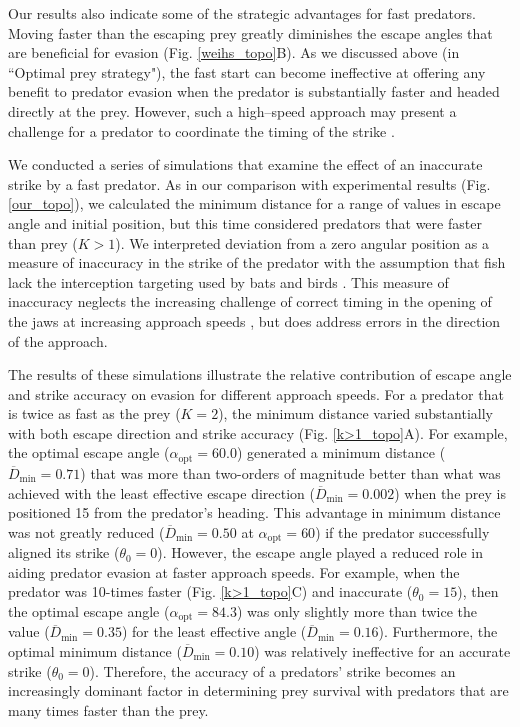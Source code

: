 \documentclass[12pt]{article}
\newcommand{\ol}{\overline}
\begin{document}
Our results also indicate some of the strategic advantages for fast predators. Moving faster than the escaping prey greatly diminishes the escape angles that are beneficial for evasion (Fig. \ref{weihs_topo}B). 
As we discussed above (in ``Optimal prey strategy"), the fast start can become ineffective at offering any benefit to predator evasion when the predator is substantially faster and headed directly at the prey. However, such a high--speed approach may present a challenge for a predator to coordinate the timing of the strike \citep{Higham:2007go, Higham:2005iu}. 

We conducted a series of simulations that examine the effect of an inaccurate strike by a fast predator. As in our comparison with experimental results (Fig. \ref{our_topo}), we calculated the minimum distance for a range of values in escape angle and initial position, but this time considered predators that were faster than prey ($K>1$). 
We interpreted deviation from a zero angular position as a measure of inaccuracy in the strike of the predator with the assumption that fish lack the interception targeting used by bats \citep{Ghose:2006dk} and birds \citep{Kane:2014fs}. This measure of inaccuracy neglects the increasing challenge of correct timing in the opening of the jaws at increasing approach speeds \citep{Kane:2014bh,Kane:2011hz}, but does address errors in the direction of the approach.

The results of these simulations illustrate the relative contribution of escape angle and strike accuracy on evasion for different approach speeds. For a predator that is twice as fast as the prey ($K=2$), the minimum distance varied substantially with both escape direction and strike accuracy (Fig. \ref{k>1_topo}A). 
For example, the optimal escape angle ($\alpha_{\text{opt}}=60.0$\textdegree) generated a minimum distance ($\ol D_{\text{min}}=0.71$) that was more than two-orders of magnitude better than what was achieved with the least effective escape direction ($\ol D_{\text{min}}=0.002$) when the prey is positioned 15\textdegree\hspace{0.5pt} from the predator's heading. 
This advantage in minimum distance was not greatly reduced ($\ol D_{\text{min}}=0.50$ at $\alpha_{\text{opt}}=60$\textdegree) if the predator successfully aligned its strike ($\theta_0=0$\textdegree). 
However, the escape angle played a reduced role in aiding predator evasion at faster approach speeds. For example, when the predator was 10-times faster  (Fig. \ref{k>1_topo}C) and inaccurate ($\theta_0=15$\textdegree), then the optimal escape angle ($\alpha_{\text{opt}}=84.3$\textdegree) was only slightly more than twice the value ($\ol D_{\text{min}}=0.35$) for the least effective angle ($\ol D_{\text{min}}=0.16$). 
Furthermore, the optimal minimum distance ($\ol D_{\text{min}}=0.10$) was relatively ineffective for an accurate strike ($\theta_0=0$\textdegree). 
Therefore, the accuracy of a predators' strike becomes an increasingly dominant factor in determining prey survival with predators that are many times faster than the prey.
\end{document}
